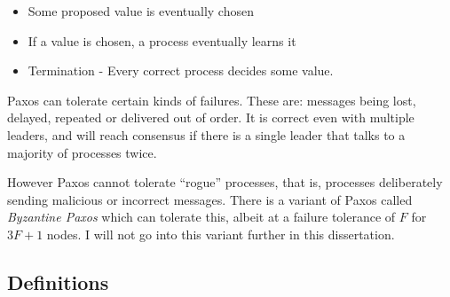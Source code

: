 \documentclass[12pt,twoside,notitlepage]{report}
\begin{document}
\begin{itemize}
\item Some proposed value is eventually chosen
\item If a value is chosen, a process eventually learns it
\item Termination - Every correct process decides some value.
\end{itemize}


Paxos can tolerate certain kinds of failures. These are: messages being lost, delayed, repeated or
delivered out of order. It is correct even with multiple leaders, and will reach consensus if
there is a single leader that talks to a majority of processes twice.

%

However Paxos cannot tolerate ``rogue'' processes, that is, processes deliberately sending
malicious or incorrect messages. There is a variant of Paxos called \emph{Byzantine Paxos} which
can tolerate this, albeit at a failure tolerance of $F$ for $3F + 1$ nodes. I will not go into
this variant further in this dissertation.

\subsection{Definitions}
\end{document}
